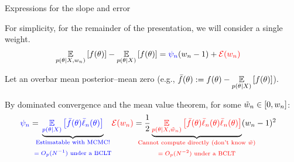 

    


\begin{frame}[t]{Expressions for the slope and error}


For simplicity, for the remainder of the presentation, we will
consider a single weight.
%
\begin{align*}
%
\expect{p(\theta \vert \xvec, \w_n)}{f(\theta)} -
    \expect{p(\theta \vert \xvec)}{f(\theta)} ={}&
    \blue{\infl_n} (\w_n - 1) + \red{\err(\w_n)}
%
\end{align*}
%

Let an overbar mean posterior--mean zero
(e.g., $\bar{f}(\theta) := f(\theta) - \underset{p(\theta \vert X)}{\mathbb{E}}\left[f(\theta)\right]$).

By dominated convergence and the mean value theorem, for some $\tilde{w}_n \in [0,w_n]$:
%
\begin{align*}
%
\blue{\infl_n} ={}&
\undernote{\blue{
    \expect{\p(\theta \vert \xvec)}{ \thetabar \ellbar_n(\theta)}
}}{\blue{\substack{
    \text{Estimatable with MCMC!} \\
    \text{\,}\\
    \text{$= O_p(N^{-1})$ under a BCLT}
}}}
&
\red{\err(\w_n)} ={}&
\frac{1}{2}
\undernote{
    \red{\expect{\p(\theta \vert \xvec, \wtil_n)}{
        \thetabar
        \ellbar_n(\theta)
        \ellbar_n(\theta)}}
}
{\red{\substack{
    \text{Cannot compute directly (don't know $\wtil$)} \\ 
    \text{\,}\\
    \text{$= O_p(N^{-2})$ under a BCLT}
}}}
(\w_n - 1)^2
%
\end{align*}
%



\end{frame}
